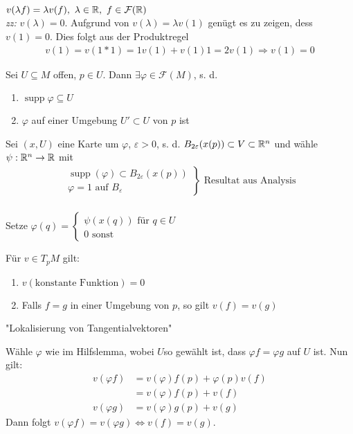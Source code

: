 \begin{bew}[zu 1.]
	$v(\lambda f) = \lambda v(f),\ \lambda \in \mathbb{R},\ f\in \mathcal{F}(\mathbb{R})$\\
	\textit{zz:} $v(\lambda) = 0$. Aufgrund von $v(\lambda) = \lambda v(1)$ genügt es zu zeigen, dess $v(1) = 0$. Dies folgt aus der Produktregel
	\begin{align*}
	v(1) = v(1*1) = 1v(1) + v(1)1 = 2v(1) \Rightarrow v(1) = 0
	\end{align*}
\end{bew}
\begin{hlem}
Sei $U \subseteq M$ offen, $p \in U$. Dann $\exists \varphi \in \mathcal{F}(M)$, s. d. 
\begin{enumerate}
\item$\operatorname{supp}\varphi\subseteq U$
\item$\varphi$ auf einer Umgebung $U' \subset U$ von $p$ ist
\end{enumerate}
\end{hlem}

\begin{bew}
Sei $(x, U)$ eine Karte um $\varphi$, $\varepsilon > 0$, s. d. $B_{2\varepsilon}(x(p))\subset V\subset \mathbb{R}^n$ und wähle $\psi:\mathbb{R}^n\rightarrow\mathbb{R}$ mit 
\begin{align*}
\left.
\begin{array}{r}
\operatorname{supp}(\varphi)\subset B_{2\varepsilon}(x(p))\\
\varphi = 1 \text{ auf } B_\varepsilon
\end{array}
\right\} \text{ Resultat aus Analysis}\\
\end{align*}

Setze $\varphi(q) = \left\{
\begin{array}{l}
\psi(x(q))\text{ für }q\in U\\
0 \text{ sonst}
\end{array}
\right.$
\end{bew}

\begin{satz}
Für $v\in T_p M$ gilt:
\begin{enumerate}
\item$v(\text{konstante Funktion}) = 0$
\item Falls $f = g$ in einer Umgebung von $p$, so gilt $v(f) = v(g)$
\end{enumerate}
"Lokalisierung von Tangentialvektoren"
\end{satz}

\begin{bew}[zu 2.]
Wähle $\varphi$ wie im Hilfslemma, wobei $U$so gewählt ist, dass $\varphi f = \varphi g$ auf $U$ ist. Nun gilt:
\begin{align*}
v(\varphi f) &= v(\varphi)f(p) + \varphi(p)v(f)\\
&= v(\varphi)f(p) + v(f)\\
v(\varphi g) &= v(\varphi)g(p) + v(g)
\end{align*}
Dann folgt $v(\varphi f) = v(\varphi g) \Leftrightarrow v(f) = v(g)$.
\end{bew}

